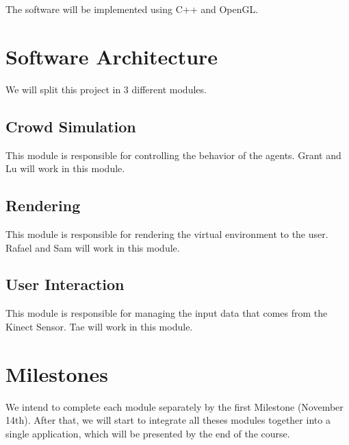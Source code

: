 \documentclass[conference, 12pt]{acmsiggraph}
\begin{document}
The software will be implemented using C++ and OpenGL.

\section{Software Architecture}

We will split this project in 3 different modules.

\subsection{Crowd Simulation}
This module is responsible for controlling the behavior of the agents. Grant and Lu will work in this module.

\subsection{Rendering}
This module is responsible for rendering the virtual environment to the user. Rafael and Sam will work in this module.

\subsection{User Interaction}
This module is responsible for managing the input data that comes from the Kinect Sensor. Tae will work in this module.

\section{Milestones}

We intend to complete each module separately by the first Milestone (November 14th). After that, we will start to integrate all theses modules together into a single application, which will be presented by the end of the course.




\end{document}

